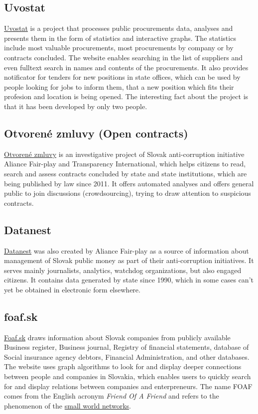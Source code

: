 \documentclass[thesis=B,english]{FITthesis}[2012/06/26]
\begin{document}
	\subsection{Uvostat}
	\href{https://www.uvostat.sk/about}{Uvostat} is a project that processes public procurements data, analyses and presents them in the form of statistics and interactive graphs. The statistics include most valuable procurements, most procurements by company or by contracts concluded. The website enables searching in the list of suppliers and even fulltext search in names and contents of the procurements. It also provides notificator for tenders for new positions in state offices, which can be used by people looking for jobs to inform them, that a new position which fits their profesion and location is being opened. The interesting fact about the project is that it has been developed by only two people.
	\subsection{Otvorené zmluvy (Open contracts)}
	\href{http://www.otvorenezmluvy.sk/o-projekte}{Otvorené zmluvy} is an investigative project of Slovak anti-corruption initiative Aliance Fair-play and Transparency International, which helps citizens to read, search and assess contracts concluded by state and state institutions, which are being published by law since 2011. It offers automated analyses and offers general public to join discussions (crowdsourcing), trying to draw attention to suspicious contracts.	
	\subsection{Datanest}
	\href{http://datanest.fair-play.sk/}{Datanest} was also created by Aliance Fair-play as a source of information about management of Slovak public money as part of their anti-corruption initiatives. It serves mainly journalists, analytics, watchdog organizations, but also engaged citizens. It contains data generated by state since 1990, which in some cases can't yet be obtained in electronic form elsewhere.
	\subsection{foaf.sk}
	\href{http://foaf.sk}{Foaf.sk} draws information about Slovak companies from publicly available Business register, Business journal, Registry of financial statements, database of Social insurance agency debtors, Financial Administration, and other databases. The website uses graph algorithms to look for and display deeper connections between people and companies in Slovakia, which enables users to quickly search for and display relations between companies and enterpreneurs. The name FOAF comes from the English acronym \textit{Friend Of A Friend} and refers to the phenomenon of the \href{http://www.scholarpedia.org/article/Small-world_network}{small world networks}.
\end{document}
